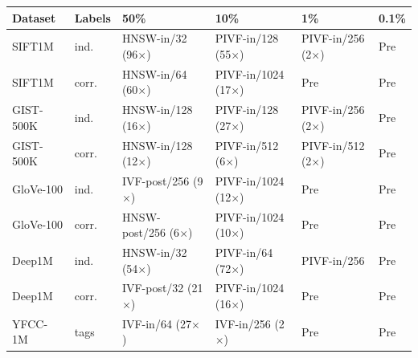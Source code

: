 \begin{tabular}{llllll}
\toprule
Dataset & Labels & 50\% & 10\% & 1\% & 0.1\% \\
\midrule
SIFT1M & ind. & HNSW-in/32 (96$\times$) & PIVF-in/128 (55$\times$) & PIVF-in/256 (2$\times$) & Pre \\
SIFT1M & corr. & HNSW-in/64 (60$\times$) & PIVF-in/1024 (17$\times$) & Pre & Pre \\
GIST-500K & ind. & HNSW-in/128 (16$\times$) & PIVF-in/128 (27$\times$) & PIVF-in/256 (2$\times$) & Pre \\
GIST-500K & corr. & HNSW-in/128 (12$\times$) & PIVF-in/512 (6$\times$) & PIVF-in/512 (2$\times$) & Pre \\
GloVe-100 & ind. & IVF-post/256 (9$\times$) & PIVF-in/1024 (12$\times$) & Pre & Pre \\
GloVe-100 & corr. & HNSW-post/256 (6$\times$) & PIVF-in/1024 (10$\times$) & Pre & Pre \\
Deep1M & ind. & HNSW-in/32 (54$\times$) & PIVF-in/64 (72$\times$) & PIVF-in/256 & Pre \\
Deep1M & corr. & IVF-post/32 (21$\times$) & PIVF-in/1024 (16$\times$) & Pre & Pre \\
YFCC-1M & tags & IVF-in/64 (27$\times$) & IVF-in/256 (2$\times$) & Pre & Pre \\
\bottomrule
\end{tabular}
